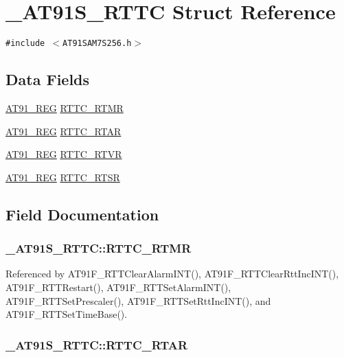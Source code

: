 \hypertarget{struct__AT91S__RTTC}{
\section{\_\-AT91S\_\-RTTC Struct Reference}
\label{struct__AT91S__RTTC}
}
{\tt \#include $<$AT91SAM7S256.h$>$}

\subsection*{Data Fields}
\begin{CompactItemize}
\item 
\hyperlink{AT91SAM7X256_8h_712ad5a1ac1bd02f3e95a7526c283ce1}{AT91\_\-REG} \hyperlink{struct__AT91S__RTTC_f7214be994c52cf0ae55e15e2ab9c9e2}{RTTC\_\-RTMR}
\item 
\hyperlink{AT91SAM7X256_8h_712ad5a1ac1bd02f3e95a7526c283ce1}{AT91\_\-REG} \hyperlink{struct__AT91S__RTTC_e75f833e12a6db82f882777c08a20870}{RTTC\_\-RTAR}
\item 
\hyperlink{AT91SAM7X256_8h_712ad5a1ac1bd02f3e95a7526c283ce1}{AT91\_\-REG} \hyperlink{struct__AT91S__RTTC_6939d12b84e3913d9d8bfeee281ea08f}{RTTC\_\-RTVR}
\item 
\hyperlink{AT91SAM7X256_8h_712ad5a1ac1bd02f3e95a7526c283ce1}{AT91\_\-REG} \hyperlink{struct__AT91S__RTTC_482110506eb725a2c144619e0bb0547d}{RTTC\_\-RTSR}
\end{CompactItemize}


\subsection{Field Documentation}
\hypertarget{struct__AT91S__RTTC_f7214be994c52cf0ae55e15e2ab9c9e2}{
\subsubsection{ {\bf \_\-AT91S\_\-RTTC::RTTC\_\-RTMR}}}
\label{struct__AT91S__RTTC_f7214be994c52cf0ae55e15e2ab9c9e2}




Referenced by AT91F\_\-RTTClearAlarmINT(), AT91F\_\-RTTClearRttIncINT(), AT91F\_\-RTTRestart(), AT91F\_\-RTTSetAlarmINT(), AT91F\_\-RTTSetPrescaler(), AT91F\_\-RTTSetRttIncINT(), and AT91F\_\-RTTSetTimeBase().\hypertarget{struct__AT91S__RTTC_e75f833e12a6db82f882777c08a20870}{
\subsubsection{ {\bf \_\-AT91S\_\-RTTC::RTTC\_\-RTAR}}}
\label{struct__AT91S__RTTC_e75f833e12a6db82f882777c08a20870}




